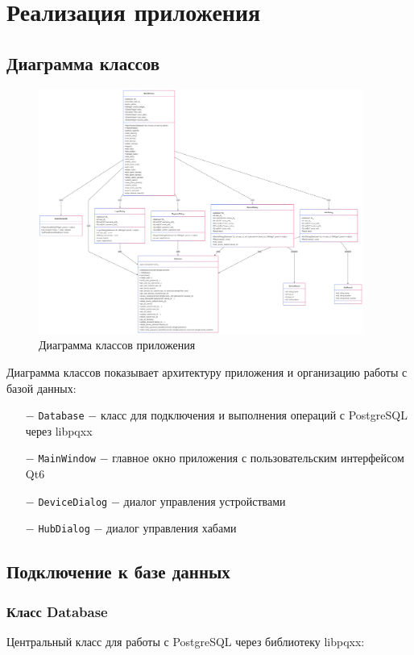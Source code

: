 \documentclass[oneside,a4paper,14pt]{extarticle}
\begin{document}
\clearpage
\section*{Реализация приложения}

\subsection*{Диаграмма классов}
\begin{figure}[H]
  \centering
  \includegraphics[width=0.95\textwidth]{pics/class_diagram.png}
  \caption{Диаграмма классов приложения}
\end{figure}

Диаграмма классов показывает архитектуру приложения и организацию работы с базой данных:
\begin{itemize}
  \item[$-$] \texttt{Database} $-$ класс для подключения и выполнения операций с PostgreSQL через libpqxx
  \item[$-$] \texttt{MainWindow} $-$ главное окно приложения с пользовательским интерфейсом Qt6
  \item[$-$] \texttt{DeviceDialog} $-$ диалог управления устройствами
  \item[$-$] \texttt{HubDialog} $-$ диалог управления хабами
\end{itemize}

\subsection*{Подключение к базе данных}

\subsubsection*{Класс Database}
\noindent Центральный класс для работы с PostgreSQL через библиотеку libpqxx:
\end{document}
